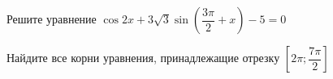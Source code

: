 \begin{ex}
	\begin{condition}
		\begin{enumcols}[label=\asbuk*)]
			\item Решите уравнение \( \cos 2x+3\sqrt{3}\sin{\left(\dfrac{3\pi}{2}+x\right)}  - 5= 0 \)
			\item Найдите все корни уравнения, принадлежащие отрезку \(  \left[2\pi;\dfrac{7\pi}{2}\right]  \)
		\end{enumcols}
	\end{condition}
\end{ex}